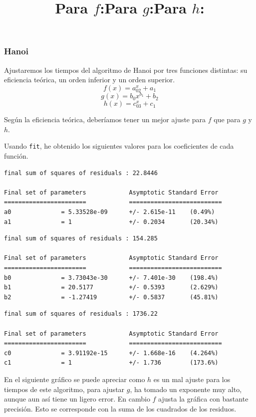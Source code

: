 \documentclass[a4]{article}
\begin{document}
\subsubsection{Hanoi}

\begin{flushleft} 
  Ajustaremos los tiempos del algoritmo de Hanoi por tres funciones
  distintas: su eficiencia teórica, un orden inferior y un orden
  superior.
\[f(x)=a_02^x+a_1\]
\[g(x)=b_0x^{b_1}+b_2\]
\[h(x)=c_03^x+c_1\]

Según la eficiencia teórica, deberíamos tener un mejor ajuste para $f$
que para $g$ y $h$.
\end{flushleft}

\begin{flushleft}
  Usando \texttt{fit}, he obtenido los siguientes valores para los
  coeficientes de cada función.
\end{flushleft}

\title{Para $f$:}
\begin{verbatim}
final sum of squares of residuals : 22.8446

Final set of parameters            Asymptotic Standard Error
=======================            ==========================
a0              = 5.33528e-09      +/- 2.615e-11    (0.49%)
a1              = 1                +/- 0.2034       (20.34%)
\end{verbatim}

\title{Para $g$:}
\begin{verbatim}
final sum of squares of residuals : 154.285

Final set of parameters            Asymptotic Standard Error
=======================            ==========================
b0              = 3.73043e-30      +/- 7.401e-30    (198.4%)
b1              = 20.5177          +/- 0.5393       (2.629%)
b2              = -1.27419         +/- 0.5837       (45.81%)
\end{verbatim}

\title{Para $h$:}
\begin{verbatim}
final sum of squares of residuals : 1736.22

Final set of parameters            Asymptotic Standard Error
=======================            ==========================
c0              = 3.91192e-15      +/- 1.668e-16    (4.264%)
c1              = 1                +/- 1.736        (173.6%)
\end{verbatim}

\begin{flushleft}
  En el siguiente gráfico se puede apreciar como $h$ es un mal ajuste
  para los tiempos de este algoritmo, para ajustar $g$, ha tomado un
  exponente muy alto, aunque aun así tiene un ligero error. En cambio
  $f$ ajusta la gráfica con bastante precisión. Esto se corresponde
  con la suma de los cuadrados de los residuos.
\end{flushleft}
\end{document}
